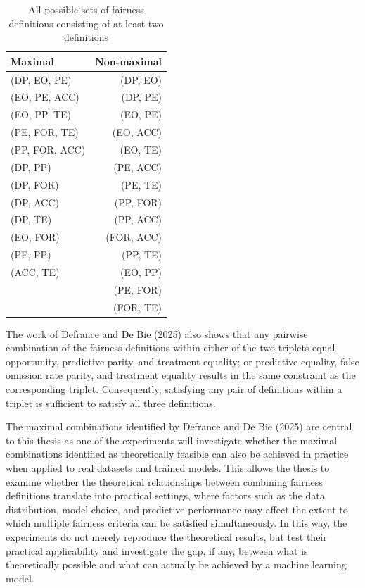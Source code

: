 \begin{table}[htbp]{}
    \centering
    \begin{tabular}{|l|r|}
        \hline
        Maximal & Non-maximal \\
        \hline
        (DP, EO, PE) & (DP, EO)\\
        (EO, PE, ACC) & (DP, PE)\\
        (EO, PP, TE) & (EO, PE)\\
        (PE, FOR, TE) & (EO, ACC)\\
        (PP, FOR, ACC) & (EO, TE)\\
        (DP, PP) & (PE, ACC)\\
        (DP, FOR) & (PE, TE)\\
        (DP, ACC) & (PP, FOR)\\
        (DP, TE) & (PP, ACC)\\
        (EO, FOR) & (FOR, ACC)\\
        (PE, PP) & (PP, TE)\\
        (ACC, TE) & (EO, PP)\\
         & (PE, FOR)\\
         & (FOR, TE)\\
         \hline
    \end{tabular}
    \caption{All possible sets of fairness definitions consisting of at least two definitions}
\label{table:combinations}
\end{table}

The work of Defrance and De Bie (2025) \cite{DefranceDeBie2025} also shows that any pairwise combination of the fairness definitions within either of the two triplets equal opportunity, predictive parity, and treatment equality; or predictive equality, false omission rate parity, and treatment equality results in the same constraint as the corresponding triplet. Consequently, satisfying any pair of definitions within a triplet is sufficient to satisfy all three definitions.

The maximal combinations identified by Defrance and De Bie (2025) \cite{DefranceDeBie2025} are central to this thesis as one of the experiments will investigate whether the maximal combinations identified as theoretically feasible can also be achieved in practice when applied to real datasets and trained models. This allows the thesis to examine whether the theoretical relationships between combining fairness definitions translate into practical settings, where factors such as the data distribution, model choice, and predictive performance may affect the extent to which multiple fairness criteria can be satisfied simultaneously. In this way, the experiments do not merely reproduce the theoretical results, but test their practical applicability and investigate the gap, if any, between what is theoretically possible and what can actually be achieved by a machine learning model.

